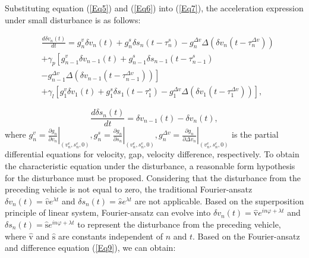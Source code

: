 \documentclass[journal]{IEEEtran}
\begin{document}
Substituting equation (\ref{Eq5}) and (\ref{Eq6}) into (\ref{Eq7}), the acceleration expression under small disturbance is as follows:

\begin{equation}
\begin{aligned}
&\frac{d \delta v_{n}(t)}{d t}=g_{n}^{v} \delta v_{n}(t)+g_{n}^{s} \delta s_{n}\left(t-\tau_{n}^{s}\right)-g_{n}^{\Delta v} \Delta\left(\delta v_{n}\left(t-\tau_{n}^{\Delta v}\right)\right) \\
&+\gamma_{p}\left[g_{n-1}^{v} \delta v_{n-1}(t)+g_{n-1}^{s} \delta s_{n-1}\left(t-\tau_{n-1}^{s}\right)\right. \\
&\left.-g_{n-1}^{\Delta v} \Delta\left(\delta v_{n-1}\left(t-\tau_{n-1}^{\Delta v}\right)\right)\right] \\
&+\gamma_{l}\left[g_{1}^{v} \delta v_{1}(t)+g_{1}^{s} \delta s_{1}\left(t-\tau_{1}^{s}\right)-g_{1}^{\Delta v} \Delta\left(\delta v_{1}\left(t-\tau_{1}^{\Delta v}\right)\right)\right],
\end{aligned}
\label{Eq8}
\end{equation}

\begin{equation}
\frac{d \delta s_{n}(t)}{d t}=\delta v_{n-1}(t)-\delta v_{n}(t),
\label{Eq9}
\end{equation}
where $g_{n}^{v}=\left.\frac{\partial g_{n}}{\partial v_{n}}\right|_{\left(v_{n}^{e}, s_{n}^{e}, 0\right)}, g_{n}^{s}=\left.\frac{\partial g_{n}}{\partial s_{n}}\right|_{\left(v_{n}^{e}, s_{n}^{e}, 0\right)}, g_{n}^{\Delta v}=\left.\frac{\partial g_{n}}{\partial \Delta v_{n}}\right|_{\left(v_{n}^{e}, s_{n}^{e}, 0\right)}$ is the partial differential equations for velocity, gap, velocity difference, respectively. To obtain the characteristic equation under the disturbance, a reasonable form hypothesis for the disturbance must be proposed. Considering that the disturbance from the preceding vehicle is not equal to zero, the traditional Fourier-ansatz $\delta v_{n}(t)=\hat{v} e^{\lambda t}$ and $\delta s_{n}(t)=\hat{s} e^{\lambda t}$ are not applicable. Based on the superposition principle of linear system, Fourier-ansatz can evolve into $\delta v_{n}(t)=\hat{\mathrm{v}} e^{i n \varphi+\lambda t}$ and $\delta s_{n}(t)=\hat{\mathrm{s}} e^{i n \varphi+\lambda t}$ to represent the disturbance from the preceding vehicle, where $\hat{\mathrm{v}}$ and $\hat{\mathrm{s}}$ are constants independent of $n$ and $t$. Based on the Fourier-ansatz and difference equation (\ref{Eq9}), we can obtain:
\end{document}
